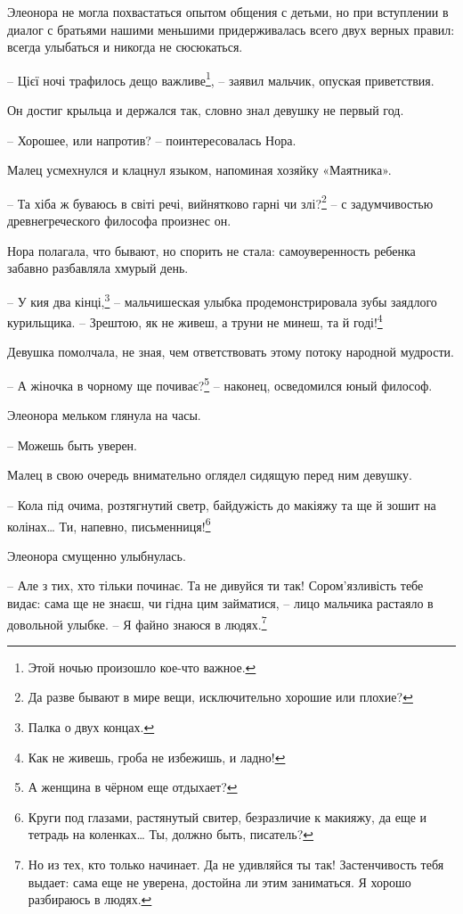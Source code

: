 \documentclass[
  a5paperpaper,
  DIV=11,
  numbers=noendperiod]{scrreprt}
\begin{document}
Элеонора не могла похвастаться опытом общения с детьми, но при
вступлении в диалог с братьями нашими меньшими придерживалась всего двух
верных правил: всегда улыбаться и никогда не сюсюкаться.

-- Цієї ночі трафилось дещо важливе\footnote{Этой ночью произошло
  кое-что важное.}, -- заявил мальчик, опуская приветствия.

Он достиг крыльца и держался так, словно знал девушку не первый год.

-- Хорошее, или напротив? -- поинтересовалась Нора.

Малец усмехнулся и клацнул языком, напоминая хозяйку «Маятника».

-- Та хіба ж буваюсь в світі речі, вийнятково гарні чи злі?\footnote{Да
  разве бывают в мире вещи, исключительно хорошие или плохие?} -- с
задумчивостью древнегреческого философа произнес он.

Нора полагала, что бывают, но спорить не стала: самоуверенность ребенка
забавно разбавляла хмурый день.

-- У кия два кінці,\footnote{Палка о двух концах.} -- мальчишеская
улыбка продемонстрировала зубы заядлого курильщика. -- Зрештою, як не
живеш, а труни не минеш, та й годі!\footnote{Как не живешь, гроба не
  избежишь, и ладно!}

Девушка помолчала, не зная, чем ответствовать этому потоку народной
мудрости.

-- А жіночка в чорному ще почиває?\footnote{А женщина в чёрном еще
  отдыхает?} -- наконец, осведомился юный философ.

Элеонора мельком глянула на часы.

-- Можешь быть уверен.

Малец в свою очередь внимательно оглядел сидящую перед ним девушку.

-- Кола під очима, розтягнутий светр, байдужість до макіяжу та ще й
зошит на колінах\ldots{} Ти, напевно, письменниця!\footnote{Круги под
  глазами, растянутый свитер, безразличие к макияжу, да еще и тетрадь на
  коленках\ldots{} Ты, должно быть, писатель?}

Элеонора смущенно улыбнулась.

-- Але з тих, хто тільки починає. Та не дивуйся ти так! Сором'язливість
тебе видає: сама ще не знаєш, чи гідна цим займатися, -- лицо мальчика
растаяло в довольной улыбке. -- Я файно знаюся в людях.\footnote{Но из
  тех, кто только начинает. Да не удивляйся ты так! Застенчивость тебя
  выдает: сама еще не уверена, достойна ли этим заниматься. Я хорошо
  разбираюсь в людях.}
\end{document}
